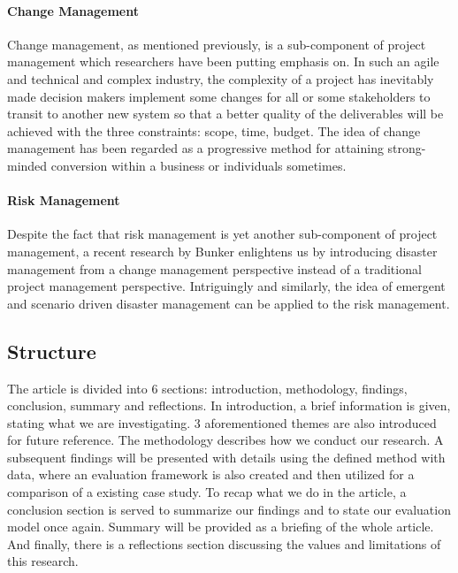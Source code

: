 \paragraph{Change Management}
Change management, as mentioned previously, is a sub-component of project management which researchers\parencite{3,6} have been putting emphasis on. In such an agile and technical and complex industry, the complexity of a project has inevitably made decision makers implement some changes for all or some stakeholders to transit to another new system\parencite[p. 1]{3} so that a better quality of the deliverables will be achieved with the three constraints: scope, time, budget. The idea of change management has been regarded as a progressive method for attaining strong-minded conversion within a business or individuals sometimes\parencite[p. 3]{3}.

\paragraph{Risk Management}
Despite the fact that risk management is yet another sub-component of project management, a recent research by Bunker enlightens us by introducing disaster management from a change management perspective instead of a traditional project management perspective\parencite[p. 10]{6}. Intriguingly and similarly, the idea of emergent and scenario driven disaster management can be applied to the risk management.

\subsection{Structure}
The article is divided into 6 sections: introduction, methodology, findings, conclusion, summary and reflections. In introduction, a brief information is given, stating what we are investigating. 3 aforementioned themes are also introduced for future reference. The methodology describes how we conduct our research. A subsequent findings will be presented with details using the defined method with data, where an evaluation framework is also created and then utilized for a comparison of a existing case study. To recap what we do in the article, a conclusion section is served to summarize our findings and to state our evaluation model once again. Summary will be provided as a briefing of the whole article. And finally, there is a reflections section discussing the values and limitations of this research.

